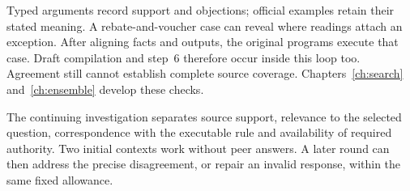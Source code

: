 \begin{MapDiagram}
\end{MapDiagram}

Typed arguments record support and objections; official examples retain their
stated meaning. A rebate-and-voucher case can reveal where readings attach an
exception. After aligning facts and outputs, the original programs execute
that case. Draft compilation and step~6 therefore occur inside this loop too.
Agreement still cannot establish complete source coverage.
Chapters~\ref{ch:search} and~\ref{ch:ensemble} develop these checks.

\clearpage
{}
The continuing investigation separates source support, relevance to the selected
question, correspondence with the executable rule and availability of required
authority. Two initial contexts work without peer answers. A later round can
then address the precise disagreement, or repair an invalid response, within
the same fixed allowance.

